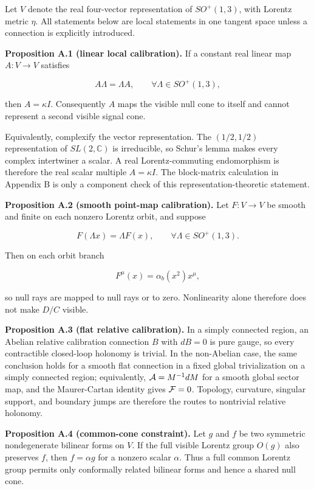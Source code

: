 \documentclass[11pt]{article}
\begin{document}
Let \(V\) denote the real four-vector representation of \(SO^+(1,3)\), with Lorentz metric \(\eta\). All statements below are local statements in one tangent space unless a connection is explicitly introduced.


\textbf{Proposition A.1 (linear local calibration).} If a constant real linear map \(A:V\to V\) satisfies


\[
A\Lambda=\Lambda A,\qquad \forall \Lambda\in SO^+(1,3),
\]


then \(A=\kappa I\). Consequently \(A\) maps the visible null cone to itself and cannot represent a second visible signal cone.


Equivalently, complexify the vector representation. The \((1/2,1/2)\) representation of \(SL(2,\mathbb C)\) is irreducible, so Schur's lemma makes every complex intertwiner a scalar. A real Lorentz-commuting endomorphism is therefore the real scalar multiple \(A=\kappa I\). The block-matrix calculation in Appendix B is only a component check of this representation-theoretic statement.


\textbf{Proposition A.2 (smooth point-map calibration).} Let \(F:V\to V\) be smooth and finite on each nonzero Lorentz orbit, and suppose


\[
F(\Lambda x)=\Lambda F(x),\qquad \forall \Lambda\in SO^+(1,3).
\]


Then on each orbit branch


\[
F^\mu(x)=\alpha_b(x^2)x^\mu,
\]


so null rays are mapped to null rays or to zero. Nonlinearity alone therefore does not make \(D/C\) visible.


\textbf{Proposition A.3 (flat relative calibration).} In a simply connected region, an Abelian relative calibration connection \(B\) with \(dB=0\) is pure gauge, so every contractible closed-loop holonomy is trivial. In the non-Abelian case, the same conclusion holds for a smooth flat connection in a fixed global trivialization on a simply connected region; equivalently, \({\cal A}=M^{-1}dM\) for a smooth global sector map, and the Maurer-Cartan identity gives \({\cal F}=0\). Topology, curvature, singular support, and boundary jumps are therefore the routes to nontrivial relative holonomy.


\textbf{Proposition A.4 (common-cone constraint).} Let \(g\) and \(f\) be two symmetric nondegenerate bilinear forms on \(V\). If the full visible Lorentz group \(O(g)\) also preserves \(f\), then \(f=\alpha g\) for a nonzero scalar \(\alpha\). Thus a full common Lorentz group permits only conformally related bilinear forms and hence a shared null cone.
\end{document}
